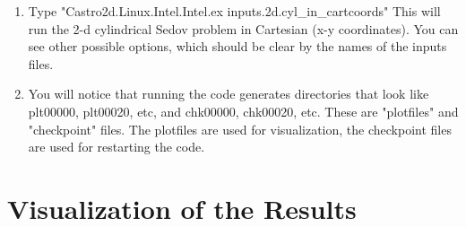 \begin{enumerate}

\item Type "Castro2d.Linux.Intel.Intel.ex inputs.2d.cyl\_in\_cartcoords" 
This will run the 2-d cylindrical Sedov problem in Cartesian (x-y coordinates). 
You can see other possible options, which should be clear by the names of the inputs files.

\item You will notice that running the code generates directories that look like 
plt00000, plt00020, etc, and chk00000, chk00020, etc. These are "plotfiles" and 
"checkpoint" files. The plotfiles are used for visualization, the checkpoint files are 
used for restarting the code.

\end{enumerate}

\section{Visualization of the Results}

